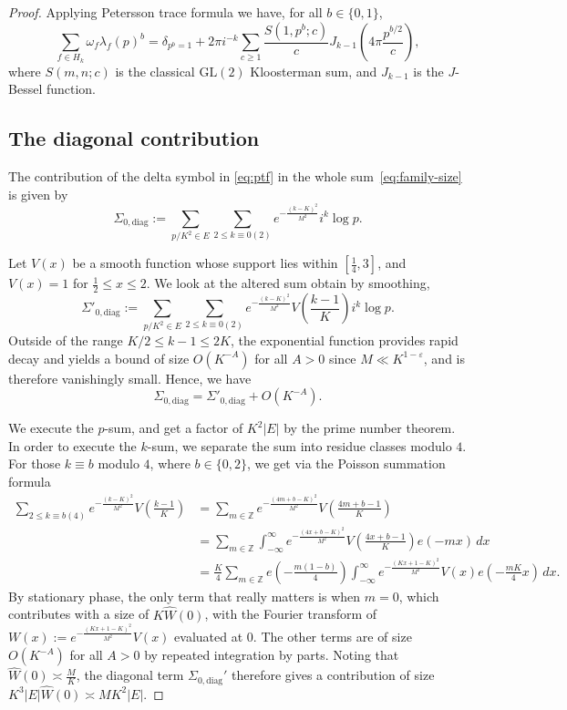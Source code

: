 \documentclass[reqno, 12pt]{amsart}
\newcommand{\diag}{\mathrm{diag}}
\renewcommand{\geq}{\geqslant}
\renewcommand{\leq}{\leqslant}
\begin{document}
\begin{proof}

Applying Petersson trace formula \cite[Propostion 2.1]{iwaniec_low_2000} we have, for all $b \in \{0,1\}$, 
\begin{equation}
\label{eq:ptf}
\sum_{f \in H_k} \omega_f \lambda_f(p)^b = \delta_{p^b = 1} + 2\pi i^{-k} \sum_{c \geq 1} \frac{S(1,p^b;c)}{c} J_{k-1} \left( 4\pi \frac{p^{b/2}}{c} \right), 
\end{equation}
where $S(m,n;c)$ is the classical $\mathrm{GL}(2)$ Kloosterman sum, and $J_{k-1}$ is the $J$-Bessel function. 

\subsection{The diagonal contribution}

The contribution of the delta symbol in \eqref{eq:ptf} in the whole sum~\eqref{eq:family-size} is given  by
\[ \Sigma_{0,\diag} := \sum_{p/K^2 \in E} \sum_{2 \leq k \equiv 0(2)} e^{-\frac{(k-K)^2}{M^2}} i^k \log p. \]

Let $V(x)$ be a smooth function whose support lies within $[\frac{1}{4},3]$, and $V(x) = 1$ for $\frac{1}{2} \leq x \leq 2$. We look at the altered sum obtain by smoothing, 
\[ \Sigma'_{0,\diag} := \sum_{p/K^2 \in E} \sum_{2 \leq k \equiv 0(2)} e^{-\frac{(k-K)^2}{M^2}} V \left( \frac{k-1}{K} \right) i^k \log p. \]
Outside of the range $K/2 \leq k-1 \leq 2K$, {the exponential function provides rapid decay and yields a bound of size $O(K^{-A})$} for all $A>0$ since $M \ll K^{1-\varepsilon}$, and is therefore vanishingly small. Hence, we have
\[ \Sigma_{0,\diag} = \Sigma'_{0,\diag} + O(K^{-A}). \]

We execute the $p$-sum, and get a factor of $K^2|E|$ by the prime number theorem. In order to execute the $k$-sum, {we separate the sum} into residue classes modulo $4$. For those $k \equiv b$ modulo $4$, where $b \in \{0,2\}$, we get via the Poisson summation formula
\begin{align*}
  \sum_{2 \leq k \equiv b(4)} e^{-\frac{(k-K)^2}{M^2}} V \left( \frac{k-1}{K} \right) &= \sum_{m \in \mathbb{Z}} e^{-\frac{(4m+b-K)^2}{M^2}} V \left( \frac{4m+b-1}{K} \right) \\
  &= \sum_{m \in \mathbb{Z}} \int_{-\infty}^\infty e^{-\frac{(4x+b-K)^2}{M^2}}V\left( \frac{4x+b-1}{K} \right) e(-mx) \,dx \\
  &= \frac{K}{4} \sum_{m \in \mathbb{Z}} e \left( -\frac{m(1-b)}{4} \right) \int_{-\infty}^\infty e^{-\frac{(Kx+1-K)^2}{M^2}}V\left( x \right) e\left(-\frac{mK}{4}x\right) \,dx.
\end{align*}
By stationary phase, the only term that really matters is when $m = 0$, which contributes with a size of $K \hat{W}(0)$,  with the Fourier transform of $W(x) := e^{-\frac{(Kx+1-K)^2}{M^2}}V\left( x \right)$ evaluated at $0$. The other terms are {of size $O( K^{-A})$} for all $A>0$ by repeated integration by parts.
{Noting that $\hat{W}(0) \asymp \frac{M}{K}$, the} diagonal term  $\Sigma_{0, \diag}'$ therefore gives a contribution of size $K^3 |E| \hat{W}(0) \asymp MK^2 |E|$.


\end{proof}
\end{document}
